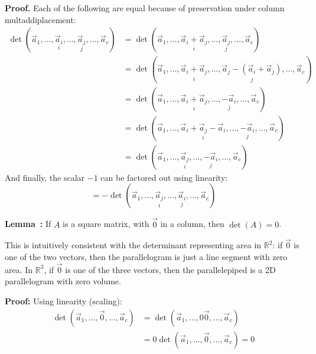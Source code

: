 \documentclass[11pt, letterpaper]{report}
\newenvironment{book}{}{}
\newcounter{theorem}[chapter]
\newenvironment{lemma}[1][]{\refstepcounter{theorem}\begin{bbox}\par
    \noindent\textbf{Lemma~\thetheorem: #1}}{\end{bbox}}
\newlength\oldfboxsep%
\newlength\myminiwidth%
\newenvironment{bbox}{%
  \setlength\oldfboxsep\fboxsep
  \setlength{\fboxsep}{.1in}%
  \setlength\myminiwidth\linewidth%
  \addtolength\myminiwidth{-0.2in}%
  \vspace{0.1in}%
  \begin{lrbox}{\bboxbox}\begin{minipage}{\myminiwidth}%
    }{%
    \end{minipage}\end{lrbox}%
  \noindent\fbox{\usebox{\bboxbox}}\vspace{0.1in}\setlength\fboxsep\oldfboxsep%
}
\newcommand{\R}{\mathbb{R}}
\begin{document}
\begin{book}
\textbf{Proof.} Each of the following are equal because of preservation under column multaddiplacement:
\begin{align*}
\det( \vec{a}_1, \ldots, \underset{i}{\vec{a}_i}, \ldots, \underset{j}{\vec{a}_j},\ldots,\vec{a}_c ) 
&=  \det(\vec{a}_1, \ldots, \underset{i}{\vec{a}_i+\vec{a}_j}, \ldots, \underset{j}{\vec{a}_j}, \ldots,\vec{a}_c) \\
&=  \det(\vec{a}_1, \ldots, \underset{i}{\vec{a}_i+\vec{a}_j}, \ldots, \underset{j}{\vec{a}_j-(\vec{a}_i+\vec{a}_j)}, \ldots,\vec{a}_c) \\
&=  \det(\vec{a}_1, \ldots, \underset{i}{\vec{a}_i+\vec{a}_j}, \ldots, \underset{j}{-\vec{a}_i}, \ldots,\vec{a}_c) \\
&=  \det(\vec{a}_1, \ldots, \underset{i}{\vec{a}_i+\vec{a}_j-\vec{a}_i}, \ldots, \underset{j}{-\vec{a}_i}, \ldots,\vec{a}_c) \\
&=  \det(\vec{a}_1, \ldots, \underset{i}{\vec{a}_j}, \ldots, \underset{j}{-\vec{a}_i}, \ldots,\vec{a}_c)
\end{align*}
And finally, the scalar $-1$ can be factored out using linearity:
\[ = - \det(\vec{a}_1, \ldots, \underset{i}{\vec{a}_j}, \ldots, \underset{j}{\vec{a}_i}, \ldots,\vec{a}_c)\]
\blacksquare
\end{book}

\begin{lemma}
\label{theorem:zero-determinants}
If $A$ is a square matrix, with $\vec{0}$ in a column, then $\det(A) = 0$.
\end{lemma}

This is intuitively consistent with the determinant representing area in $\R^{2}$: if $\vec{0}$ is one of the two vectors, then the parallelogram is just a line segment with zero area. In $\R^3$, if $\vec{0}$ is one of the three vectors, then the parallelepiped is a 2D parallelogram with zero volume.

\textbf{Proof:} Using linearity (scaling):
\begin{align*}
 \det( \vec{a}_1, \ldots, \vec{0}, \ldots,\vec{a}_c ) &=  \det( \vec{a}_1, \ldots, 0\vec{0}, \ldots,\vec{a}_c ) \\
&=  0\det( \vec{a}_1, \ldots, \vec{0}, \ldots,\vec{a}_c ) = 0
\end{align*}
\blacksquare
\end{document}
